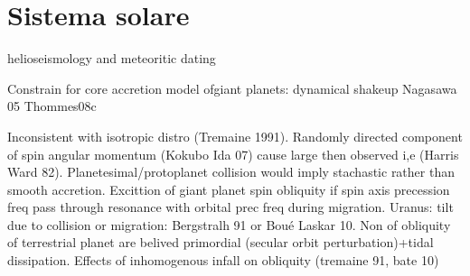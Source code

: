 {\let\clearpage\relax\let\cleardoublepage\relax
\chapter{Sistema solare}
}



\begin{workout}

\end{workout}

\begin{workout}
helioseismology and meteoritic dating
\end{workout}

\begin{workout}

\end{workout}

\begin{workout}

\end{workout}

\begin{workout}

\end{workout}

\begin{workout}

\end{workout}


\begin{workout}
Constrain for core accretion model ofgiant planets: dynamical shakeup Nagasawa 05 Thommes08c
\end{workout}


\begin{workout}

\end{workout}



\begin{workout}
Inconsistent with isotropic distro (Tremaine 1991). Randomly directed component of spin angular momentum (Kokubo Ida 07) cause large then observed i,e (Harris Ward 82).
Planetesimal/protoplanet collision would imply stachastic rather than smooth accretion.
Excittion of giant planet spin obliquity if spin axis precession freq pass through resonance with orbital prec freq during migration.
Uranus: tilt due to collision or migration: Bergstralh 91 or Bou\'e Laskar 10.
Non of obliquity of terrestrial planet are belived primordial (secular orbit perturbation)+tidal dissipation.
Effects of inhomogenous infall on obliquity (tremaine 91, bate 10)
\end{workout}



